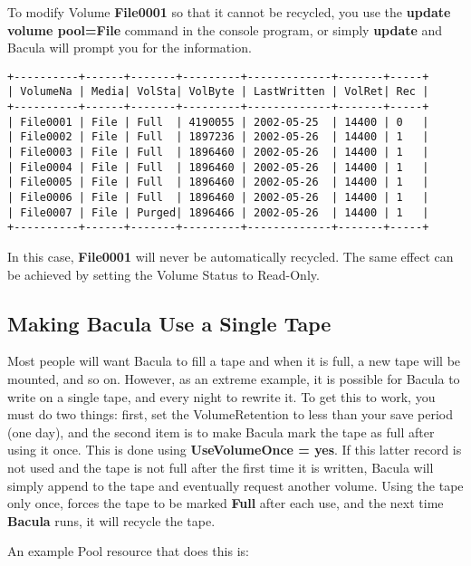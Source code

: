 To modify Volume {\bf File0001} so that it cannot be recycled, you use the
{\bf update volume pool=File} command in the console program, or simply {\bf
update} and Bacula will prompt you for the information. 

\footnotesize
\begin{verbatim}
+----------+------+-------+---------+-------------+-------+-----+
| VolumeNa | Media| VolSta| VolByte | LastWritten | VolRet| Rec |
+----------+------+-------+---------+-------------+-------+-----+
| File0001 | File | Full  | 4190055 | 2002-05-25  | 14400 | 0   |
| File0002 | File | Full  | 1897236 | 2002-05-26  | 14400 | 1   |
| File0003 | File | Full  | 1896460 | 2002-05-26  | 14400 | 1   |
| File0004 | File | Full  | 1896460 | 2002-05-26  | 14400 | 1   |
| File0005 | File | Full  | 1896460 | 2002-05-26  | 14400 | 1   |
| File0006 | File | Full  | 1896460 | 2002-05-26  | 14400 | 1   |
| File0007 | File | Purged| 1896466 | 2002-05-26  | 14400 | 1   |
+----------+------+-------+---------+-------------+-------+-----+
\end{verbatim}
\normalsize

In this case, {\bf File0001} will never be automatically recycled. The same
effect can be achieved by setting the Volume Status to Read-Only. 

\subsection*{Making Bacula Use a Single Tape}
\label{singletape}

Most people will want Bacula to fill a tape and when it is full, a new tape
will be mounted, and so on. However, as an extreme example, it is possible for
Bacula to write on a single tape, and every night to rewrite it. To get this
to work, you must do two things: first, set the VolumeRetention to less than
your save period (one day), and the second item is to make Bacula mark the
tape as full after using it once. This is done using {\bf UseVolumeOnce =
yes}. If this latter record is not used and the tape is not full after the
first time it is written, Bacula will simply append to the tape and eventually
request another volume. Using the tape only once, forces the tape to be marked
{\bf Full} after each use, and the next time {\bf Bacula} runs, it will
recycle the tape. 

An example Pool resource that does this is: 

